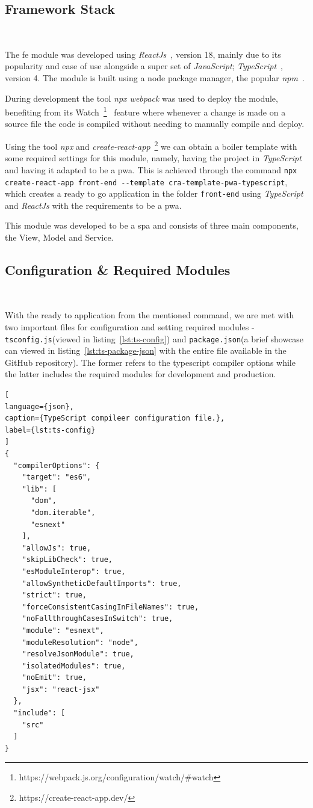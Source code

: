 \subsection{Framework Stack}~\label{ch:impl:sec:fe:subsec:framework-stack}

The \acrshort{fe} module was developed using \textit{ReactJs}~\cite{reactjs}, version 18, mainly due to its popularity and ease of use alongside a super set of \textit{JavaScript}; \textit{TypeScript}~\cite{typescript}, version 4. The module is built using a node package manager, the popular \textit{npm}~\cite{npm}. 

During development the tool \textit{npx webpack} was used to deploy the module, benefiting from its Watch~\footnote{https://webpack.js.org/configuration/watch/\#watch}~\label{fn:webpack-watch} feature where whenever a change is made on a source file the code is compiled without needing to manually compile and deploy. 


Using the tool \textit{npx} and \textit{create-react-app}~\footnote{https://create-react-app.dev/} we can obtain a boiler template with some required settings for this module, namely, having the project in \textit{TypeScript} and having it adapted to be a \acrshort{pwa}. This is achieved through the command \lstinline{npx create-react-app front-end --template cra-template-pwa-typescript}, which creates a ready to go application in the folder \lstinline{front-end} using \textit{TypeScript} and \textit{ReactJs} with the requirements to be a \acrshort{pwa}.

This module was developed to be a \acrfull{spa} and consists of three main components, the View, Model and Service.

\subsection{Configuration \& Required Modules}~\label{ch:impl:sec:fe:subsec:config-and-modules}

With the ready to application from the mentioned command, we are met with two important files for configuration and setting required modules - \texttt{tsconfig.js}(viewed in listing~\ref{lst:ts-config}) and \texttt{package.json}(a brief showcase can viewed in listing~\ref{lst:ts-package-json} with the entire file available in the GitHub repository). The former refers to the typescript compiler options while the latter includes the required modules for development and production.

\begin{lstlisting}[
language={json},
caption={TypeScript compileer configuration file.},
label={lst:ts-config}
]
{
  "compilerOptions": {
    "target": "es6",
    "lib": [
      "dom",
      "dom.iterable",
      "esnext"
    ],
    "allowJs": true,
    "skipLibCheck": true,
    "esModuleInterop": true,
    "allowSyntheticDefaultImports": true,
    "strict": true,
    "forceConsistentCasingInFileNames": true,
    "noFallthroughCasesInSwitch": true,
    "module": "esnext",
    "moduleResolution": "node",
    "resolveJsonModule": true,
    "isolatedModules": true,
    "noEmit": true,
    "jsx": "react-jsx"
  },
  "include": [
    "src"
  ]
}
\end{lstlisting}


